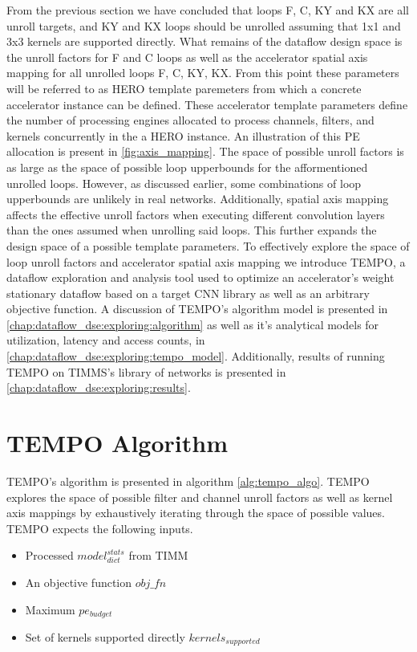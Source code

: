 From the previous section we have concluded that loops F, C, KY and KX are all
unroll targets, and KY and KX loops should be unrolled assuming that 1x1 and 3x3
kernels are supported directly. What remains of the dataflow design space is the unroll factors for F
and C loops as well as the accelerator spatial axis mapping for all unrolled
loops F, C, KY, KX. From this point these parameters will be referred to as
HERO template paremeters from which a concrete accelerator instance can
be defined. These accelerator template parameters define the number of
processing engines allocated to process channels, filters, and kernels
concurrently in the a HERO instance. An illustration of this \ac{PE}
allocation is present in \autoref{fig:axis_mapping}. The space of possible
unroll factors is as large as the space of possible loop upperbounds for the
afformentioned unrolled loops. However, as discussed earlier, some combinations
of loop upperbounds are unlikely in real networks. Additionally, spatial axis
mapping affects the effective unroll factors when executing different
convolution layers than the ones assumed when unrolling said loops. This further
expands the design space of a possible template parameters. To
effectively explore the space of loop unroll factors and accelerator spatial
axis mapping we introduce \ac{TEMPO}, a dataflow exploration and analysis tool
used to optimize an accelerator's weight stationary dataflow based on a target
CNN library as well as an arbitrary objective function. A discussion of
\ac{TEMPO}'s algorithm model is presented in
\autoref{chap:dataflow_dse:exploring:algorithm} as well as it's analytical models
for utilization, latency and access counts, in \autoref{chap:dataflow_dse:exploring:tempo_model}. Additionally, results
of running \ac{TEMPO} on TIMMS's library of networks is presented in
\autoref{chap:dataflow_dse:exploring:results}. 

\section{TEMPO Algorithm}
\label{chap:dataflow_dse:exploring:algorithm}

TEMPO's algorithm is presented in algorithm \ref{alg:tempo_algo}. TEMPO explores the
space of possible filter and channel unroll factors as well as kernel axis
mappings by exhaustively iterating through the space of possible values. TEMPO
expects the following inputs. 

\begin{itemize}
\item Processed $model^{stats}_{dict}$ from TIMM
\item An objective function $obj\_fn$
\item Maximum $pe_{budget}$ 
\item Set of kernels supported directly  $kernels_{supported}$ 
\end{itemize}

